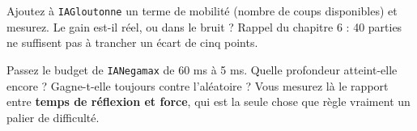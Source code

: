 \begin{nkexo}
Ajoutez à \texttt{IAGloutonne} un terme de mobilité (nombre de coups
disponibles) et mesurez. Le gain est-il réel, ou dans le bruit ? Rappel du
chapitre 6 : 40 parties ne suffisent pas à trancher un écart de cinq points.
\end{nkexo}

\begin{nkexo}[5 — Le budget]
Passez le budget de \texttt{IANegamax} de 60 ms à 5 ms. Quelle profondeur
atteint-elle encore ? Gagne-t-elle toujours contre l'aléatoire ? Vous mesurez là
le rapport entre \textbf{temps de réflexion et force}, qui est la seule chose que
règle vraiment un palier de difficulté.
\end{nkexo}
